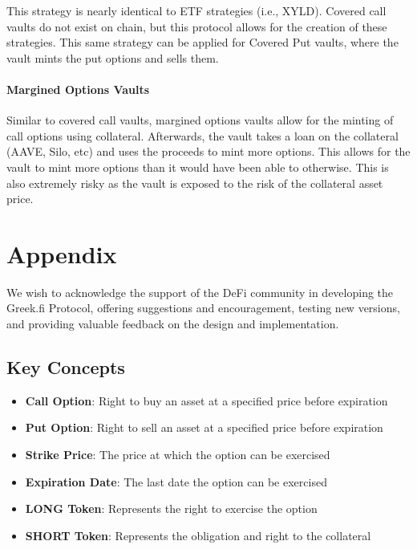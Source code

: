 This strategy is nearly identical to ETF strategies (i.e., XYLD). Covered
call vaults do not exist on chain, but this protocol allows for the
creation of these strategies. This same strategy can be applied for
Covered Put vaults, where the vault mints the put options and sells
them.

\paragraph*{Margined Options Vaults}

Similar to covered call vaults, margined options vaults allow for the
minting of call options using collateral. Afterwards, the vault takes a
loan on the collateral (AAVE, Silo, etc) and uses the proceeds to mint
more options. This allows for the vault to mint more options than it
would have been able to otherwise. This is also extremely risky as the 
vault is exposed to the risk of the collateral asset price.

\section{\label{sec:appendix}Appendix}


\begin{acknowledgments}
We wish to acknowledge the support of the DeFi community in developing
the Greek.fi Protocol, offering suggestions and encouragement, testing new versions,
and providing valuable feedback on the design and implementation.
\end{acknowledgments}

\appendix

\subsection{Key Concepts}

\begin{itemize}
\item
  \textbf{Call Option}: Right to buy an asset at a specified price
  before expiration
\item
  \textbf{Put Option}: Right to sell an asset at a specified price
  before expiration
\item
  \textbf{Strike Price}: The price at which the option can be exercised
\item
  \textbf{Expiration Date}: The last date the option can be exercised
\item
  \textbf{LONG Token}: Represents the right to exercise the option
\item
  \textbf{SHORT Token}: Represents the obligation and right to the
  collateral
\end{itemize}


